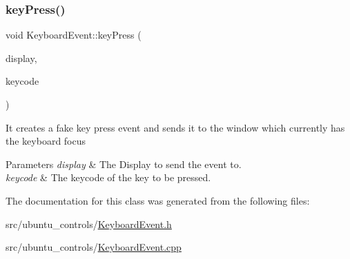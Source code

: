 \subsubsection{\texorpdfstring{key\+Press()}{keyPress()}}
{\footnotesize\ttfamily void Keyboard\+Event\+::key\+Press (\begin{DoxyParamCaption}\item[{Display $\ast$}]{display,  }\item[{int}]{keycode }\end{DoxyParamCaption})}

It creates a fake key press event and sends it to the window which currently has the keyboard focus


\begin{DoxyParams}{Parameters}
{\em display} & The Display to send the event to. \\
\hline
{\em keycode} & The keycode of the key to be pressed. \\
\hline
\end{DoxyParams}


The documentation for this class was generated from the following files\+:\begin{DoxyCompactItemize}
\item 
src/ubuntu\+\_\+controls/\hyperlink{KeyboardEvent_8h}{Keyboard\+Event.\+h}\item 
src/ubuntu\+\_\+controls/\hyperlink{KeyboardEvent_8cpp}{Keyboard\+Event.\+cpp}\end{DoxyCompactItemize}
